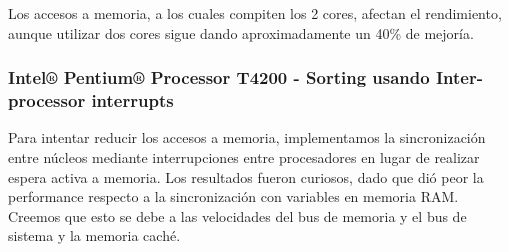 	Los accesos a memoria, a los cuales compiten los 2 cores, afectan el rendimiento, aunque utilizar dos cores sigue dando aproximadamente un 40\% de mejoría.
	
\subsubsection{Intel® Pentium® Processor T4200 - Sorting usando Inter-processor interrupts}

Para intentar reducir los accesos a memoria, implementamos la sincronización entre núcleos mediante interrupciones entre procesadores en lugar de realizar espera activa a memoria. Los resultados fueron curiosos, dado que dió peor la performance respecto a la sincronización con variables en memoria RAM. Creemos que esto se debe a las velocidades del bus de memoria y el bus de sistema y la memoria caché.

